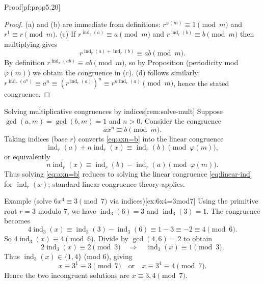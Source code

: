 \documentclass[10pt]{article}
\theoremstyle{definition}
\theoremstyle{plain}
\numberwithin{equation}{section}
\begin{document}
\begin{define}{Proof}[pf:prop5.20]
\begin{proof}
(a) and (b) are immediate from definitions: \(r^{\varphi(m)}\equiv1\pmod m\) and \(r^1\equiv r\pmod m\).
(c) If \(r^{\operatorname{ind}_r(a)}\equiv a\pmod m\) and \(r^{\operatorname{ind}_r(b)}\equiv b\pmod m\) then multiplying gives
\[
r^{\operatorname{ind}_r(a)+\operatorname{ind}_r(b)}\equiv ab\pmod m.
\]
By definition \(r^{\operatorname{ind}_r(ab)}\equiv ab\pmod m\), so by Proposition  (periodicity mod \(\varphi(m)\)) we obtain the congruence in (c).
(d) follows similarly: \(r^{\operatorname{ind}_r(a^n)}\equiv a^n\equiv(r^{\operatorname{ind}_r(a)})^n\equiv r^{n\operatorname{ind}_r(a)}\pmod m\), hence the stated congruence.
\end{proof}
\end{define}

\bigskip

\begin{define}{Solving multiplicative congruences by indices}[rem:solve-mult]
Suppose \(\gcd(a,m)=\gcd(b,m)=1\) and \(n>0\). Consider the congruence
\begin{equation}\label{eq:axn=b}
a x^n \equiv b \pmod m.
\end{equation}
Taking indices (base \(r\)) converts \eqref{eq:axn=b} into the linear congruence
\[
\operatorname{ind}_r(a)+n\operatorname{ind}_r(x)\equiv \operatorname{ind}_r(b)\pmod{\varphi(m)},
\]
or equivalently
\begin{equation}\label{eq:linear-ind}
n\operatorname{ind}_r(x)\equiv \operatorname{ind}_r(b)-\operatorname{ind}_r(a)\pmod{\varphi(m)}.
\end{equation}
Thus solving \eqref{eq:axn=b} reduces to solving the linear congruence \eqref{eq:linear-ind} for \(\operatorname{ind}_r(x)\); standard linear congruence theory applies.
\end{define}

\begin{define}{Example (solve \(6x^4\equiv 3\pmod7\) via indices)}[ex:6x4=3mod7]
Using the primitive root \(r=3\) modulo \(7\), we have \(\operatorname{ind}_3(6)=3\) and \(\operatorname{ind}_3(3)=1\). The congruence becomes
\[
4\operatorname{ind}_3(x)\equiv \operatorname{ind}_3(3)-\operatorname{ind}_3(6)\equiv 1-3\equiv -2\equiv 4\pmod{6}.
\]
So \(4\operatorname{ind}_3(x)\equiv 4\pmod 6\). Divide by \(\gcd(4,6)=2\) to obtain
\[
2\operatorname{ind}_3(x)\equiv 2\pmod 3 \quad\Longrightarrow\quad \operatorname{ind}_3(x)\equiv 1\pmod 3.
\]
Thus \(\operatorname{ind}_3(x)\in\{1,4\}\) (mod \(6\)), giving
\[
x\equiv 3^{1}\equiv 3\pmod 7\quad\text{or}\quad x\equiv 3^{4}\equiv 4\pmod7.
\]
Hence the two incongruent solutions are \(x\equiv 3,4\pmod7\).
\end{define}
\end{document}
